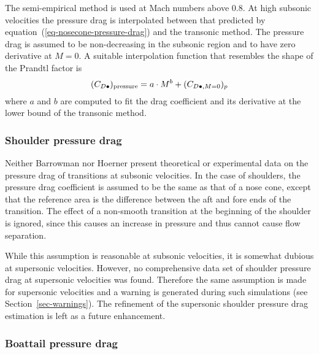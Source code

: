 The semi-empirical method is used at Mach numbers above 0.8.  
At high subsonic velocities the pressure drag is interpolated between
that predicted by equation~(\ref{eq-nosecone-pressure-drag}) and the
transonic method.  The pressure drag is assumed to be non-decreasing
in the subsonic region and to have zero derivative at $M=0$.  A
suitable interpolation function that resembles the shape of the
Prandtl factor is
%
\begin{equation}
(C_{D\bullet})_{\rm pressure} = a\cdot M^b + (C_{D\bullet,M=0})_p
\label{eq-nosecone-pressure-interpolator}
\end{equation}
%
where $a$ and $b$ are computed to fit the drag coefficient and its
derivative at the lower bound of the transonic method.



\subsubsection{Shoulder pressure drag}

Neither Barrowman nor Hoerner present theoretical or experimental
data on the pressure drag of transitions at subsonic velocities.  In
the case of shoulders, the pressure drag coefficient is assumed to be
the same as that of a nose cone, except that the reference area is the
difference between the aft and fore ends of the transition.  The
effect of a non-smooth transition at the beginning of the shoulder is
ignored, since this causes an increase in pressure and thus cannot
cause flow separation.

While this assumption is reasonable at subsonic velocities, it is
somewhat dubious at supersonic velocities.  However, no comprehensive
data set of shoulder pressure drag at supersonic velocities was
found.  Therefore the same assumption is made for supersonic
velocities and a warning is generated during such simulations (see
Section~\ref{sec-warnings}).  The refinement of the supersonic
shoulder pressure drag estimation is left as a future enhancement.



\subsubsection{Boattail pressure drag}


